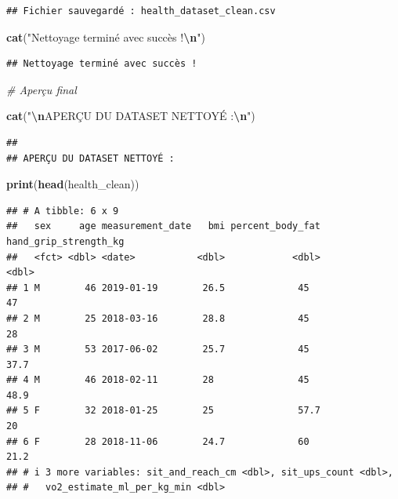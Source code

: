 \documentclass[
]{article}
\newenvironment{Shaded}{\begin{snugshade}}{\end{snugshade}}
\newcommand{\CommentTok}[1]{\textcolor[rgb]{0.56,0.35,0.01}{\textit{#1}}}
\newcommand{\FunctionTok}[1]{\textcolor[rgb]{0.13,0.29,0.53}{\textbf{#1}}}
\newcommand{\NormalTok}[1]{#1}
\newcommand{\SpecialCharTok}[1]{\textcolor[rgb]{0.81,0.36,0.00}{\textbf{#1}}}
\newcommand{\StringTok}[1]{\textcolor[rgb]{0.31,0.60,0.02}{#1}}
\begin{document}
\begin{verbatim}
## Fichier sauvegardé : health_dataset_clean.csv
\end{verbatim}

\begin{Shaded}
\begin{Highlighting}[]
\FunctionTok{cat}\NormalTok{(}\StringTok{"Nettoyage terminé avec succès !}\SpecialCharTok{\textbackslash{}n}\StringTok{"}\NormalTok{)}
\end{Highlighting}
\end{Shaded}

\begin{verbatim}
## Nettoyage terminé avec succès !
\end{verbatim}

\begin{Shaded}
\begin{Highlighting}[]
\CommentTok{\# Aperçu final}

\FunctionTok{cat}\NormalTok{(}\StringTok{"}\SpecialCharTok{\textbackslash{}n}\StringTok{APERÇU DU DATASET NETTOYÉ :}\SpecialCharTok{\textbackslash{}n}\StringTok{"}\NormalTok{)}
\end{Highlighting}
\end{Shaded}

\begin{verbatim}
## 
## APERÇU DU DATASET NETTOYÉ :
\end{verbatim}

\begin{Shaded}
\begin{Highlighting}[]
\FunctionTok{print}\NormalTok{(}\FunctionTok{head}\NormalTok{(health\_clean))}
\end{Highlighting}
\end{Shaded}

\begin{verbatim}
## # A tibble: 6 x 9
##   sex     age measurement_date   bmi percent_body_fat hand_grip_strength_kg
##   <fct> <dbl> <date>           <dbl>            <dbl>                 <dbl>
## 1 M        46 2019-01-19        26.5             45                    47  
## 2 M        25 2018-03-16        28.8             45                    28  
## 3 M        53 2017-06-02        25.7             45                    37.7
## 4 M        46 2018-02-11        28               45                    48.9
## 5 F        32 2018-01-25        25               57.7                  20  
## 6 F        28 2018-11-06        24.7             60                    21.2
## # i 3 more variables: sit_and_reach_cm <dbl>, sit_ups_count <dbl>,
## #   vo2_estimate_ml_per_kg_min <dbl>
\end{verbatim}
\end{document}
